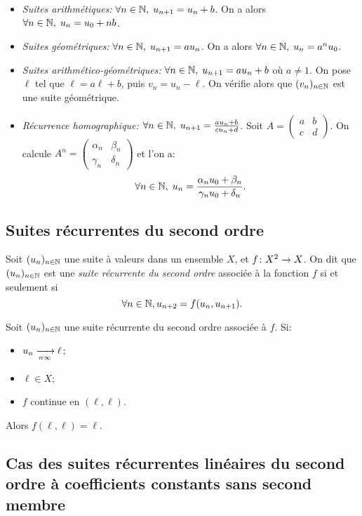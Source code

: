 \documentclass{yann}
\newcommand\U{(u_n)_{n\in\N}}
\newcommand\V{(v_n)_{n\in\N}}
\begin{document}
\begin{itemize}
\item
\emph{Suites arithmétiques:}
  $\forall n\in\mathbb{N},\; u_{n+1} = u_n + b$.
  On a alors $\forall n\in\mathbb{N},\; u_n = u_0 + nb$.
\item
\emph{Suites géométriques:}
  $\forall n\in\mathbb{N},\; u_{n+1} = a u_n$.
  On a alors $\forall n\in\mathbb{N},\; u_n = a^n u_0$.
\item
\emph{Suites arithmético-géométriques:}
  $\forall n\in\mathbb{N},\; u_{n+1} = au_n + b$ où $a\neq1$.
  On pose $\ell$ tel que $\ell= a\ell+ b$, puis $v_n = u_n -\ell$.
  On vérifie alors que $\V$ est une suite géométrique.
\item
\emph{Récurrence homographique:}
  $\forall n\in\mathbb{N},\; u_{n+1} = \frac{a u_n + b}{c u_n + d}$.
  Soit $A = \begin{pmatrix} a & b \\ c & d \end{pmatrix}$.
  On calcule $A^n = \begin{pmatrix} \alpha_n & \beta_n \\ \gamma_n & \delta_n \end{pmatrix}$
  et l'on a:
  \[ \forall n\in\mathbb{N},\;
  u_n = \frac{\alpha_n u_0 +\beta_n}{\gamma_n u_0 +\delta_n}. \]
\end{itemize}

\subsection{Suites récurrentes du second ordre}


Soit $\U$ une suite à valeurs dans un ensemble $X$,
et $f\colon X^2\to X$.
On dit que $\U$ est une \emph{suite récurrente du second ordre} associée à la fonction $f$
si et seulement si \[ \forall n\in\mathbb{N}, u_{n+2} = f(u_n, u_{n+1}). \]


Soit $\U$ une suite récurrente du second ordre associée à $f$.
Si:
\begin{itemize}
\item
$u_n \xrightarrow[{n\infty}]{}\ell$;
\item
$\ell\in X$;
\item
$f$ continue en $(\ell,\ell)$.
\end{itemize}

Alors $f(\ell,\ell) =\ell$.

\subsection{Cas des suites récurrentes linéaires du second ordre à coefficients constants sans second membre}
\end{document}
